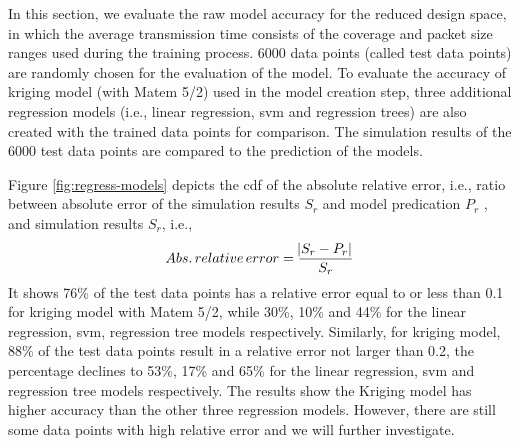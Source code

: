 In this section, we evaluate the \gls{raw} model accuracy for the reduced design space, in which the average transmission time consists of the coverage and packet size ranges used during the training process. 
6000 data points (called test data points) are randomly chosen for the evaluation of the model. To evaluate the accuracy of kriging model (with Matem 5/2) used in the model creation step, three additional regression models (i.e., linear regression, \gls{svm} and regression trees) are also created with the trained data points for comparison. The simulation results of the 6000 test data points are compared to the prediction of the models. 



Figure \ref{fig:regress-models} depicts the \gls{cdf} of the absolute relative error, i.e., ratio between absolute error of the simulation results $S_r$ and model predication $P_r$ , and simulation results $S_r$, i.e., 
\begin{equation}
Abs. \thinspace relative \thinspace error = \frac{\abs{S_r - P_r} }{S_r} 
\end{equation}
It shows 76\% of the test data points has a relative error equal to or less than 0.1 for kriging model with Matem 5/2, while 30\%, 10\% and 44\% for the linear regression, \gls{svm}, regression tree models respectively. Similarly,  for kriging model, 88\% of the test data points result in  a relative error not larger than 0.2, the percentage declines to 53\%, 17\% and 65\% for the linear regression, \gls{svm} and regression tree models respectively. The results show the Kriging model has higher accuracy than the other three regression models. However, there are still some data points with high relative error and we will further investigate. 


